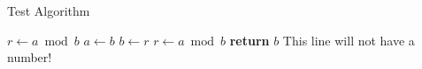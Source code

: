 \documentclass[11pt]{article}
\makeatletter
\def\NoNumber#1{{\def\alglinenumber##1{}\State #1}\addtocounter{ALG@line}{-1}}
\makeatother
\begin{document}
\begin{algorithm}
\renewcommand{\thealgorithm}{}
\caption{Test Algorithm}\label{euclid}
\begin{algorithmic}[1]
  \State $r\gets a\bmod b$
      \State $a\gets b$
      \State $b\gets r$
       \State $r\gets a\bmod b$
       \EndWhile\label{euclidendwhile}
       \State \textbf{return} $b$
       \NoNumber{This line will not have a number!}
       \EndProcedure
\end{algorithmic}
\end{algorithm}
\end{document}
